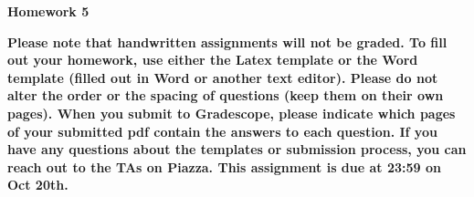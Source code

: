 \documentclass[12pt]{article}
\date{}
\begin{document}
	\begin{flushleft}
		\large \bf
		Homework 5 \\
	\end{flushleft}
{\bf
Please note that handwritten assignments will not be graded. To fill out your homework, use either the Latex template or the Word template (filled out in Word or another text editor). Please do not alter the order or the spacing of questions (keep them on their own pages). When you submit to Gradescope, please indicate which pages of your submitted pdf contain the answers to each question. If you have any questions about the templates or submission process, you can reach out to the TAs on Piazza. This assignment is due at 23:59 on Oct 20th.
}
\end{document}
